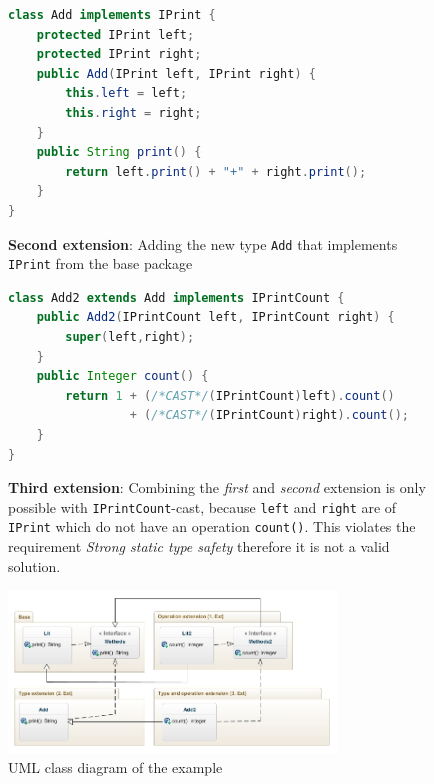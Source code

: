 \documentclass{report}
\begin{document}
\begin{figure}[H]
\begin{lstlisting}[language=java]
class Add implements IPrint {
    protected IPrint left;
    protected IPrint right;
    public Add(IPrint left, IPrint right) {
        this.left = left;
        this.right = right;
    }
    public String print() {
        return left.print() + "+" + right.print();
    }
}
\end{lstlisting}
\vspace{-5pt}
\caption{\textbf{Second extension}: Adding the new type \lstinline{Add} that implements \lstinline{IPrint} from the base package}
\label{exampleSecondExtension}
\end{figure}
\begin{figure}[H]
\vspace{-10pt}
\begin{lstlisting}[language=java,commentstyle=\color{red}]
class Add2 extends Add implements IPrintCount {
    public Add2(IPrintCount left, IPrintCount right) {
        super(left,right);
    }
    public Integer count() {
        return 1 + (/*CAST*/(IPrintCount)left).count() 
                 + (/*CAST*/(IPrintCount)right).count();
    }
}
\end{lstlisting}
\vspace{-5pt}
\caption{\textbf{Third extension}: Combining the \emph{first} and \emph{second} extension is only possible with \lstinline{IPrintCount}-cast, because \lstinline{left} and \lstinline{right} are of \lstinline{IPrint} which do not have an operation \lstinline{count()}. This violates the requirement \emph{Strong static type safety} therefore it is not a valid solution.}
\label{exampleThirdExtension}
\end{figure}

\begin{figure}[H]

\includegraphics[width=330px,keepaspectratio=true]{Expression_problem-diag.jpg}

\caption{UML class diagram of the example}
\label{exampleClassDiagram}
\end{figure}
\end{document}
